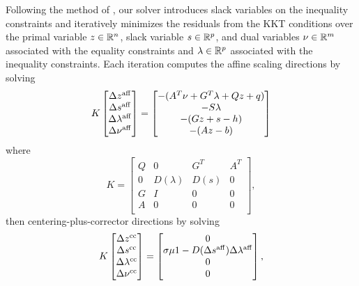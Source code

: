 Following the method of \citet{mattingley2012cvxgen},
our solver introduces slack variables on the inequality constraints
and iteratively minimizes the residuals from the KKT conditions
over the primal variable $z\in\mathbb{R}^n$, slack variable $s\in\mathbb{R}^p$,
and dual variables
$\nu\in\mathbb{R}^m$ associated with the equality constraints and
$\lambda\in\mathbb{R}^p$ associated with the inequality constraints.
Each iteration computes the affine scaling directions by solving
\begin{equation}
    K
    \begin{bmatrix}
        \Delta z^{\rm aff}       \\
        \Delta s^{\rm aff}       \\
        \Delta \lambda^{\rm aff} \\
        \Delta \nu^{\rm aff}     \\
    \end{bmatrix}
    =
    \begin{bmatrix}
        -(A^T\nu + G^T\lambda + Qz + q) \\
        -S\lambda                       \\
        -(Gz+s-h)                       \\
        -(Az-b)                         \\
    \end{bmatrix}
    \label{eq:cvxgen:affine}
\end{equation}
where
\begin{equation*}
    K =
    \begin{bmatrix}
        Q & 0          & G^T  & A^T \\
        0 & D(\lambda) & D(s) & 0   \\
        G & I          & 0    & 0   \\
        A & 0          & 0    & 0   \\
    \end{bmatrix},
\end{equation*}
then centering-plus-corrector directions by solving
\begin{equation}
    K
    \begin{bmatrix}
        \Delta z^{\rm cc}       \\
        \Delta s^{\rm cc}       \\
        \Delta \lambda^{\rm cc} \\
        \Delta \nu^{\rm cc}     \\
    \end{bmatrix}
    =
    \begin{bmatrix}
        0                                                            \\
        \sigma\mu 1 - D(\Delta s^{\rm aff}) \Delta \lambda^{\rm aff} \\
        0                                                            \\
        0                                                            \\
    \end{bmatrix},
    \label{eq:cvxgen:cc}
\end{equation}
